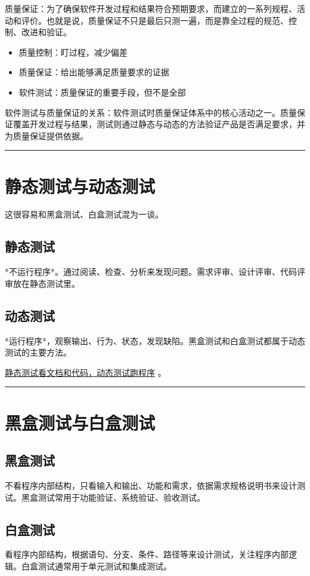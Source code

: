 \documentclass[11pt]{article}
\begin{document}
质量保证：为了确保软件开发过程和结果符合预期要求，而建立的一系列规程、活动和评价。也就是说，质量保证不只是最后只测一遍，而是靠全过程的规范、控制、改进和验证。

\begin{itemize}
\item 质量控制：盯过程，减少偏差
\item 质量保证：给出能够满足质量要求的证据
\item 软件测试：质量保证的重要手段，但不是全部
\end{itemize}


软件测试与质量保证的关系：软件测试时质量保证体系中的核心活动之一。质量保证覆盖开发过程与结果，测试则通过静态与动态的方法验证产品是否满足要求，并为质量保证提供依据。

\noindent\rule{\textwidth}{0.5pt}
\section{静态测试与动态测试}
\label{sec:org815dd31}
这很容易和黑盒测试、白盒测试混为一谈。
\subsection{静态测试}
\label{sec:orgd0538ca}
*不运行程序*。通过阅读、检查、分析来发现问题。需求评审、设计评审、代码评审放在静态测试里。
\subsection{动态测试}
\label{sec:org34333b2}
*运行程序*，观察输出、行为、状态，发现缺陷。黑盒测试和白盒测试都属于动态测试的主要方法。

\uline{静态测试看文档和代码，动态测试跑程序} 。

\noindent\rule{\textwidth}{0.5pt}
\section{黑盒测试与白盒测试}
\label{sec:org604270e}
\subsection{黑盒测试}
\label{sec:orge340ec7}
不看程序内部结构，只看输入和输出、功能和需求，依据需求规格说明书来设计测试。黑盒测试常用于功能验证、系统验证、验收测试。
\subsection{白盒测试}
\label{sec:org99cd041}
看程序内部结构，根据语句、分支、条件、路径等来设计测试，关注程序内部逻辑。白盒测试通常用于单元测试和集成测试。
\end{document}
